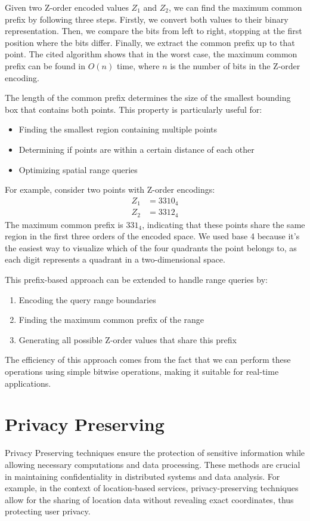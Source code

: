 Given two Z-order encoded values \( Z_1 \) and \( Z_2 \), we can find the maximum common prefix by following three steps. Firstly, we convert both values to their binary representation. Then, we compare the bits from left to right, stopping at the first position where the bits differ. Finally, we extract the common prefix up to that point. The cited algorithm shows that in the worst case, the maximum common prefix can be found in \( O(n) \) time, where \( n \) is the number of bits in the Z-order encoding.

The length of the common prefix determines the size of the smallest bounding box that contains both points. This property is particularly useful for:
\begin{itemize}
    \item Finding the smallest region containing multiple points
    \item Determining if points are within a certain distance of each other
    \item Optimizing spatial range queries
\end{itemize}

For example, consider two points with Z-order encodings:
\begin{align*}
    Z_1 &= 3310_4 \\
    Z_2 &= 3312_4
\end{align*}
The maximum common prefix is \( 331_4 \), indicating that these points share the same region in the first three orders of the encoded space. We used base 4 because it's the easiest way to visualize which of the four quadrants the point belongs to, as each digit represents a quadrant in a two-dimensional space.

This prefix-based approach can be extended to handle range queries by:
\begin{enumerate}
    \item Encoding the query range boundaries
    \item Finding the maximum common prefix of the range
    \item Generating all possible Z-order values that share this prefix
\end{enumerate}

The efficiency of this approach comes from the fact that we can perform these operations using simple bitwise operations, making it suitable for real-time applications.


\section{Privacy Preserving}
Privacy Preserving techniques ensure the protection of sensitive information while allowing necessary computations and data processing. These methods are crucial in maintaining confidentiality in distributed systems and data analysis. For example, in the context of location-based services, privacy-preserving techniques allow for the sharing of location data without revealing exact coordinates, thus protecting user privacy.

